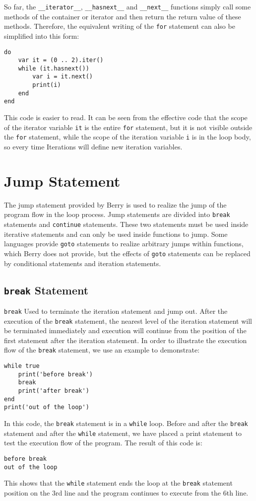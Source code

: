 So far, the \texttt{\_\_iterator\_\_}, \texttt{\_\_hasnext\_\_} and \texttt{\_\_next\_\_} functions simply call some methods of the container or iterator and then return the return value of these methods. Therefore, the equivalent writing of the \texttt{for} statement can also be simplified into this form:
\begin{lstlisting}[language=berry]
do
    var it = (0 .. 2).iter()
    while (it.hasnext())
        var i = it.next()
        print(i)
    end
end
\end{lstlisting}
This code is easier to read. It can be seen from the effective code that the scope of the iterator variable \texttt{it} is the entire \texttt{for} statement, but it is not visible outside the \texttt{for} statement, while the scope of the iteration variable \texttt{i} is in the loop body, so every time Iterations will define new iteration variables.
\fi

\section {Jump Statement}

The jump statement provided by Berry is used to realize the jump of the program flow in the loop process. Jump statements are divided into \texttt{break} statements and \texttt{continue} statements. These two statements must be used inside iterative statements and can only be used inside functions to jump. Some languages   provide \texttt{goto} statements to realize arbitrary jumps within functions, which Berry does not provide, but the effects of \texttt{goto} statements can be replaced by conditional statements and iteration statements.

\subsection{\texttt{break} Statement}

\texttt{break} Used to terminate the iteration statement and jump out. After the execution of the \texttt{break} statement, the nearest level of the iteration statement will be terminated immediately and execution will continue from the position of the first statement after the iteration statement. In order to illustrate the execution flow of the \texttt{break} statement, we use an example to demonstrate:
\begin{lstlisting}[language=berry]
while true
    print('before break')
    break
    print('after break')
end
print('out of the loop')
\end{lstlisting}
In this code, the \texttt{break} statement is in a \texttt{while} loop. Before and after the \texttt{break} statement and after the \texttt{while} statement, we have placed a print statement to test the execution flow of the program. The result of this code is:
\begin{lstlisting}[numbers=none]
before break
out of the loop
\end{lstlisting}
This shows that the \texttt{while} statement ends the loop at the \texttt{break} statement position on the 3rd line and the program continues to execute from the 6th line.

